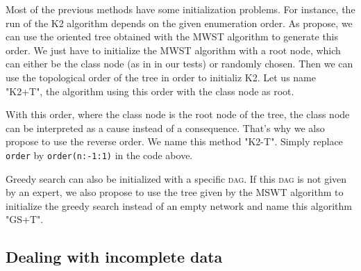 Most of the previous methods have some initialization problems.
For instance, the run of the K2 algorithm depends on the given enumeration order.
As \cite{Hec94} propose, we can use the oriented tree obtained with the MWST algorithm to generate this order.
We just have to initialize the MWST algorithm with a root node, which can either be the class node (as in in our tests) or randomly chosen.
Then we can use the topological order of the tree in order to initializ K2.
Let us name "K2+T", the algorithm using this order with the class node as root.
\vspace{-1.25\baselineskip}

\vspace{.5\baselineskip}

\noindent With this order, where the class node is the root node of the tree, the class node can be interpreted as a cause instead of a consequence. That's why we also propose to use the reverse order. We name this method "K2-T".
%
Simply replace \texttt{order} by \texttt{order(n:-1:1)} in the code above.

\noindent Greedy search can also be initialized with a specific \textsc{dag}. If this \textsc{dag} is not given by an expert, we also propose to use the tree given by the MSWT algorithm to initialize the greedy search instead of an empty network and name this algorithm "GS+T".
\vspace{-1.25\baselineskip}


\subsection{Dealing with incomplete data}
